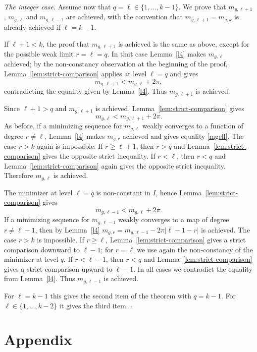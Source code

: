 \documentclass[12pt, a4paper]{article}
\renewcommand{\(}{\left(}
\renewcommand{\)}{\right)}
\begin{document}
\smallskip

\noindent\emph{The integer case.}
Assume now that $q=\ell\in\{1,\dots,k-1\}$. We prove that $m_{g,\ell+1}$, $m_{g,\ell}$ and $m_{g,\ell-1}$ are achieved, with the convention that $m_{g,\ell+1}=m_{g,k}$ is already achieved if $\ell=k-1$.

If $\ell+1<k$, the proof that $m_{g,\ell+1}$ is achieved is the same as above, except for the possible weak limit $r=\ell=q$. In that case Lemma~\ref{l4} makes $m_{g,\ell}$ achieved; by the non-constancy observation at the beginning of the proof, Lemma~\ref{lem:strict-comparison} applies at level $\ell=q$ and gives
\[
 m_{g,\ell+1}<m_{g,\ell}+2\pi,
\]
contradicting the equality given by Lemma~\ref{l4}. Thus $m_{g,\ell+1}$ is achieved.

Since $\ell+1>q$ and $m_{g,\ell+1}$ is achieved, Lemma~\ref{lem:strict-comparison} gives
\[
 m_{g,\ell}<m_{g,\ell+1}+2\pi.
\]
As before, if a minimizing sequence for $m_{g,\ell}$ weakly converges to a function of degree $r\neq \ell$, Lemma~\ref{l4} makes $m_{g,r}$ achieved and gives equality \eqref{mgell}. The case $r>k$ again is impossible. If $r\ge \ell+1$, then $r>q$ and Lemma~\ref{lem:strict-comparison} gives the opposite strict inequality. If $r<\ell$, then $r<q$ and Lemma~\ref{lem:strict-comparison} again gives the opposite strict inequality. Therefore $m_{g,\ell}$ is achieved.

The minimizer at level $\ell=q$ is non-constant in $I$, hence Lemma~\ref{lem:strict-comparison} gives
\[
 m_{g,\ell-1}<m_{g,\ell}+2\pi.
\]
If a minimizing sequence for $m_{g,\ell-1}$  weakly converges to a map of degree $r\neq \ell-1$, then by Lemma~\ref{l4} $m_{g,r}= m_{g,\ell-1}-2\pi |\ell-1-r|$ is achieved. The case $r>k$ is impossible. If $r\ge \ell$, Lemma~\ref{lem:strict-comparison} gives a strict comparison downward to $\ell-1$; for $r=\ell$ we use again the non-constancy of the minimizer at level $q$. If $r<\ell-1$, then $r<q$ and Lemma~\ref{lem:strict-comparison} gives a strict comparison upward to $\ell-1$. In all cases we contradict the equality from Lemma~\ref{l4}. Thus $m_{g,\ell-1}$ is achieved.

For $\ell=k-1$ this gives the second item of the theorem with $q=k-1$. For $\ell\in\{1,\dots,k-2\}$ it gives the third item.
\hfill$\square$


\appendix

\section{Appendix}
\end{document}

